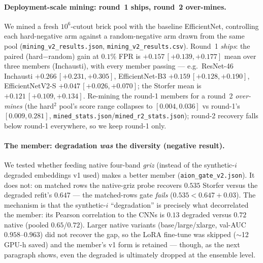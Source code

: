 \paragraph{Deployment-scale mining: round~1 ships, round~2 over-mines.} We mined a
fresh $10^{6}$-cutout brick pool with the baseline EfficientNet, controlling each
hard-negative arm against a random-negative arm drawn from the same pool
(\texttt{mining\_v2\_results.json}, \texttt{mining\_v2\_results.csv}). Round~1
\emph{ships}: the paired (hard$-$random) gain at $0.1\%$ FPR is
$+0.157\,[+0.139,+0.177]$ mean over three members (Inchausti), with every member
passing --- e.g.\ ResNet-46 Inchausti $+0.266\,[+0.231,+0.305]$,
EfficientNet-B3 $+0.159\,[+0.128,+0.190]$, EfficientNetV2-S $+0.047\,[+0.026,+0.070]$;
the Storfer mean is $+0.121\,[+0.109,+0.134]$. Re-mining the round-1
members for a round~2 \emph{over-mines} (the hard$^2$ pool's score range collapses
to $[0.004,0.036]$ vs round-1's $[0.009,0.281]$, \texttt{mined\_stats.json}/\texttt{mined\_r2\_stats.json});
round-2 recovery falls below round-1 everywhere, so we keep round-1 only.

\paragraph{The \aion{} member: degradation \emph{was} the diversity (negative
result).} We tested whether feeding \aion{} native four-band \emph{griz} (instead of
the synthetic-$i$ degraded embeddings v1 used) makes a better member
(\texttt{aion\_gate\_v2.json}). It does not: on matched rows the native-griz probe
recovers $0.535$ Storfer versus the degraded refit's $0.647$ --- the
matched-rows gate \emph{fails} ($0.535 < 0.647+0.03$). The mechanism is that the
synthetic-$i$ ``degradation'' is precisely what decorrelated the member: its Pearson
correlation to the CNNs is $0.13$ degraded versus $0.72$ native (pooled
$0.65$/$0.72$). Larger native variants (base/large/xlarge,
val-AUC $0.958$--$0.963$) did not recover the gap, so the LoRA fine-tune was skipped
($\sim$12 GPU-h saved) and the member's v1 form is retained --- though, as the next
paragraph shows, even the degraded \aion{} is ultimately dropped at the ensemble
level.

